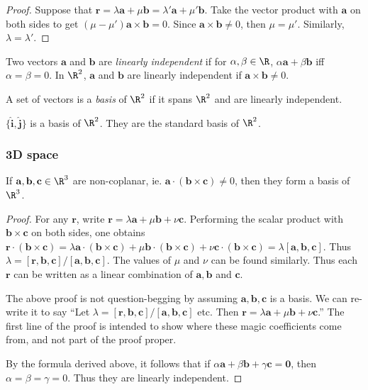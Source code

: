 \documentclass[a4paper]{article}
\begin{document}
\begin{proof}
  Suppose that $\mathbf{r} = \lambda\mathbf{a} + \mu\mathbf{b} = \lambda'\mathbf{a} + \mu'\mathbf{b}$. Take the vector product with $\mathbf{a}$ on both sides to get $(\mu - \mu')\mathbf{a\times b} = 0$. Since $\mathbf{a\times b}\not= 0$, then $\mu=\mu'$. Similarly, $\lambda = \lambda'$.
\end{proof}

\begin{defi}
  Two vectors $\mathbf{a}$ and $\mathbf{b}$ are \emph{linearly independent} if  for $\alpha, \beta\in \R$, $\alpha\mathbf{a} + \beta\mathbf{b}$ iff $\alpha = \beta = 0$. In $\R^2$, $\mathbf{a}$ and $\mathbf{b}$ are linearly independent if $\mathbf{a\times b} \not= 0$.
\end{defi}

\begin{defi}[Basis of $\R^2$]
  A set of vectors is a \emph{basis} of $\R^2$ if it spans $\R^2$ and are linearly independent.
\end{defi}

\begin{eg}
  $\mathbf{\{\hat{i}, \hat{j}\}}$ is a basis of $\R^2$. They are the standard basis of $\R^2$.
\end{eg}

\subsubsection{3D space}
\begin{thm}
  If $\mathbf{a, b, c}\in\R^3$ are non-coplanar, ie. $\mathbf{a\cdot(b\times c)}\not= 0$, then they form a basis of $\R^3$.
\end{thm}

\begin{proof}
  For any $\mathbf{r}$, write $\mathbf{r} = \lambda\mathbf{a} + \mu\mathbf{b} + \nu\mathbf{c}$. Performing the scalar product with $\mathbf{b\times c}$ on both sides, one obtains $\mathbf{r\cdot(b\times c)} = \lambda \mathbf{a\cdot(b\times c)} + \mu\mathbf{b\cdot (b\times c)} + \nu\mathbf{c\cdot(b\times c)} = \lambda \mathbf{[a, b, c]}$. Thus $\lambda = \mathbf{[r, b, c]/[a,b, c]}$. The values of $\mu$ and $\nu$ can be found similarly. Thus each $\mathbf{r}$ can be written as a linear combination of $\mathbf{a, b}$ and $\mathbf{c}$.

  \note The above proof is not question-begging by assuming $\mathbf{a, b, c}$ is a basis. We can re-write it to say ``Let $\lambda = \mathbf{[r, b, c]/[a,b, c]}$ etc. Then $\mathbf{r} = \lambda\mathbf{a} + \mu\mathbf{b} + \nu\mathbf{c}$.'' The first line of the proof is intended to show where these magic coefficients come from, and not part of the proof proper.

  By the formula derived above, it follows that if $\alpha\mathbf{a} + \beta\mathbf{b} + \gamma\mathbf{c} = \mathbf{0}$, then $\alpha = \beta = \gamma = 0$. Thus they are linearly independent.
\end{proof}
\end{document}
